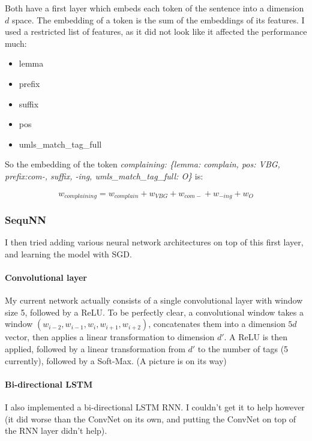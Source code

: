 \documentclass[10pt,a4paper]{article}
\begin{document}
  Both have a first layer which embeds each token of the sentence into a dimension $d$ space. The embedding of a token is the sum of the embeddings of its features. I used a restricted list of features, as it did not look like it affected the performance much:
  
  \begin{itemize}
  \item lemma
  \item prefix
  \item suffix
  \item pos
  \item umls\_match\_tag\_full
  \end{itemize}
  
  So the embedding of the token {\sl{ complaining: \{lemma: complain, pos: VBG, prefix:com-, suffix, -ing, umls\_match\_tag\_full: O\}}} is:
  
  $$w_{complaining} = w_{complain} + w_{VBG} + w_{com-} + w_{-ing} + w_{O}$$

\subsubsection{SequNN}

  I then tried adding various neural network architectures on top of this first layer, and learning the model with SGD.

  \paragraph{Convolutional layer}
  
  My current network actually consists of a single convolutional layer with window size 5, followed by a ReLU. To be perfectly clear, a convolutional window takes a window $(w_{i-2}, w_{i-1}, w_{i}, w_{i+1}, w_{i+2})$, concatenates them into a dimension $5d$ vector, then applies a linear transformation to dimension $d'$. A ReLU is then applied, followed by a linear transformation from $d'$ to the number of tags (5 currently), followed by a Soft-Max. (A picture is on its way)

  \paragraph{Bi-directional LSTM}

  I also implemented a bi-directional LSTM RNN. I couldn't get it to help however (it did worse than the ConvNet on its own, and putting the ConvNet on top of the RNN layer didn't help).
\end{document}
